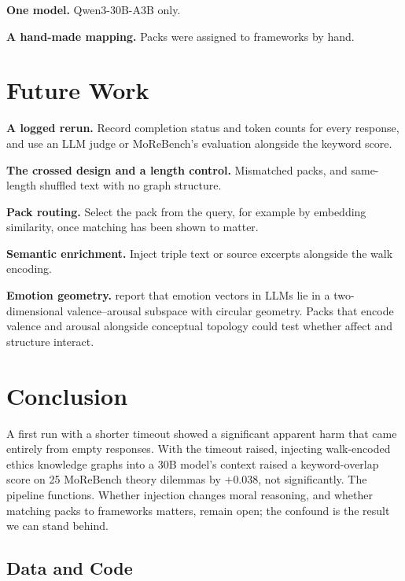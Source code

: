\documentclass[11pt,a4paper]{article}
\begin{document}
\textbf{One model.} Qwen3-30B-A3B only.

\textbf{A hand-made mapping.} Packs were assigned to frameworks by hand.

\section{Future Work}

\textbf{A logged rerun.} Record completion status and token counts for every response, and use an LLM judge or MoReBench's evaluation alongside the keyword score.

\textbf{The crossed design and a length control.} Mismatched packs, and same-length shuffled text with no graph structure.

\textbf{Pack routing.} Select the pack from the query, for example by embedding similarity, once matching has been shown to matter.

\textbf{Semantic enrichment.} Inject triple text or source excerpts alongside the walk encoding.

\textbf{Emotion geometry.} \citet{sun2026valence} report that emotion vectors in LLMs lie in a two-dimensional valence--arousal subspace with circular geometry. Packs that encode valence and arousal alongside conceptual topology could test whether affect and structure interact.

\section{Conclusion}

A first run with a shorter timeout showed a significant apparent harm that came entirely from empty responses. With the timeout raised, injecting walk-encoded ethics knowledge graphs into a 30B model's context raised a keyword-overlap score on 25 MoReBench theory dilemmas by $+$0.038, not significantly. The pipeline functions. Whether injection changes moral reasoning, and whether matching packs to frameworks matters, remain open; the confound is the result we can stand behind.

\subsection*{Data and Code}
\end{document}
